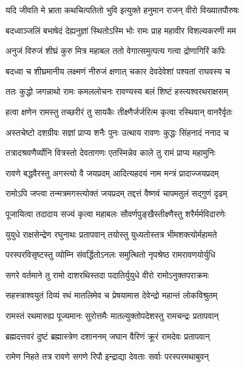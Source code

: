 \twolineshloka
{यदि जीवति मे भ्राता कथचित्पतितो भुवि}
{इत्युक्ते हनुमान राजन् वीरो विख्यातपौरुषः} %

\twolineshloka
{बदध्वाञ्जलिं बभाषेदं देह्यनुज्ञां स्थितोऽस्मि भोः}
{रामः प्राह महावीर विशल्यकरणी मम} %

\twolineshloka
{अनुजं विरुजं शीघ्रं कुरु मित्र महाबल}
{ततो वेगात्समुत्पत्य गत्वा द्रोणागिरिं कपिः} %

\twolineshloka
{बदध्वा च शीघ्रमानीय लक्ष्मणं नीरुजं क्षणात्}
{चकार देवदेवेशां पश्यतां राघवस्य च} %

\twolineshloka
{ततः कुद्धो जगन्नाथो रामः कमललोचनः}
{रावण्यस्य बलं शिष्टं हस्त्यश्वरथराक्षसम्} %

\twolineshloka
{हत्वा क्षणेन रामस्तु तच्छरीरं तु सायकैः}
{तीक्ष्णैर्जर्जरित्म कृत्वा रस्थिवान् वानरैर्वृतः} %

\twolineshloka
{अस्तचेष्टो दशग्रीवः सज्ञां प्राप्य शनैः पुनः}
{उत्थाय रावणः कुद्धः सिंहनादं ननाद च} %

\twolineshloka
{तत्रादश्रवणैर्व्योनि वित्रस्तो देवतागणः}
{एतस्मिन्नेव काले तु रामं प्राप्य महामुनिः} %

\twolineshloka
{रावणे बद्धवैरस्तु अगस्त्यो वै जयप्रदम्}
{आदित्यहदयं नाम मन्त्रं प्रादाज्जयप्रदम्} %

\twolineshloka
{रामोऽपि जप्त्वा तन्मत्रमगस्त्योक्तं जयप्रदम्}
{तद्दत्तं वैष्णवं चापमतुलं सद्गुणं दृढम्} %

\twolineshloka
{पूजायित्वा तदादाय सज्यं कृत्वा महाबलः}
{सौवर्णपुङ्खैस्तीक्ष्णैस्तु शरैर्मर्मविदारणेः} %

\twolineshloka
{युयुधे राक्षसेन्द्रेण रघुनाथः प्रतापवान्}
{तयोस्तु युध्यतोस्तत्र भीमशक्त्योर्महामते} %

\twolineshloka
{परस्परविसृष्टस्तु व्योम्नि संवर्द्धितोऽनलः}
{समुत्थितो नृपश्रेष्ठ रामरावणयोर्युधि} %

\twolineshloka
{सगरे वर्तमाने तु रामो दाशरथिस्तदा}
{पदातिर्युयुधे वीरो रामोऽनुक्तपराक्रमः} %

\twolineshloka
{सहस्त्राश्वयुतं दिव्यं रथं मातलिमेव च}
{प्रेषयामास देवेन्द्रो महान्तं लोकविश्रुतम्} %

\twolineshloka
{रामस्तं रथमारुह्य पूज्यमानः सुरोत्तमैः}
{मातल्युक्तोपदेशस्तु रामचन्द्रः प्रतापवान्} %

\twolineshloka
{ब्रह्मदत्तवरं दुष्टं ब्रह्मास्त्रेण दशाननम्}
{जघान वैरिणं क्रूरं रामदेवः प्रतापवान्} %

\twolineshloka
{रामेण निहते तत्र रावणे सगणे रिपौ}
{इन्द्राद्या देवताः सर्वाः परस्परमथाबुवन्} %

